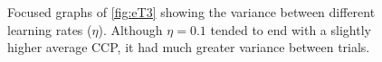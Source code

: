 \documentclass[letterpaper, 11 pt]{article}
\begin{document}
\begin{figure}[bt]
	\vspace{-2 cm}
	\centering
	\caption{	Focused graphs of \ref{fig:eT3} showing the variance between different
				learning rates ($\eta$). Although $\eta=0.1$ tended to end with a
				slightly higher average CCP, it had much greater variance between trials.
			}
	\label{fig:e1ex2}
\end{figure}
\end{document}
